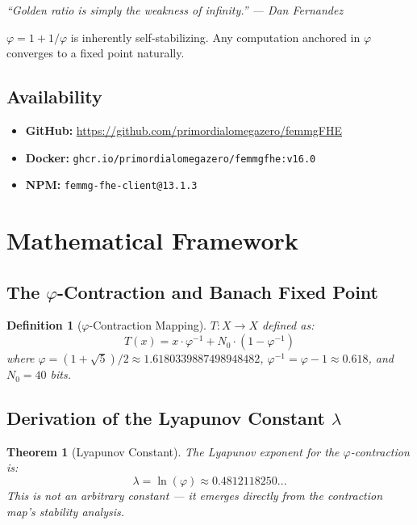 \documentclass{article}
\newtheorem{theorem}{Theorem}[section]
\newtheorem{definition}{Definition}[section]
\begin{document}
\textit{``Golden ratio is simply the weakness of infinity.'' — Dan Fernandez}

$\varphi = 1 + 1/\varphi$ is inherently self-stabilizing. Any computation anchored in $\varphi$ converges to a fixed point naturally.

\subsection{Availability}

\begin{itemize}
    \item \textbf{GitHub:} \url{https://github.com/primordialomegazero/femmgFHE}
    \item \textbf{Docker:} \texttt{ghcr.io/primordialomegazero/femmgfhe:v16.0}
    \item \textbf{NPM:} \texttt{femmg-fhe-client@13.1.3}
\end{itemize}

\section{Mathematical Framework}

\subsection{The $\varphi$-Contraction and Banach Fixed Point}

\begin{definition}[$\varphi$-Contraction Mapping]
$T: X \to X$ defined as:
\begin{equation}
T(x) = x \cdot \varphi^{-1} + N_0 \cdot (1 - \varphi^{-1})
\end{equation}
where $\varphi = (1+\sqrt{5})/2 \approx 1.6180339887498948482$, $\varphi^{-1} = \varphi - 1 \approx 0.618$, and $N_0 = 40$ bits.
\end{definition}

\subsection{Derivation of the Lyapunov Constant $\lambda$}

\begin{theorem}[Lyapunov Constant]
The Lyapunov exponent for the $\varphi$-contraction is:
\begin{equation}
\lambda = \ln(\varphi) \approx 0.4812118250...
\end{equation}
This is not an arbitrary constant — it emerges directly from the contraction map's stability analysis.
\end{theorem}
\end{document}
